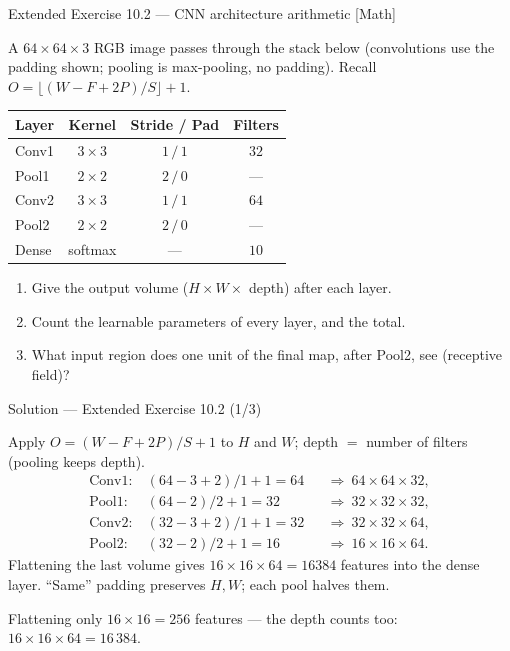 \documentclass[aspectratio=169,11pt]{beamer}
\begin{document}
\begin{frame}{Extended Exercise 10.2 --- CNN architecture arithmetic [Math]}
\begin{longexercise}
  A $64\times64\times3$ RGB image passes through the stack below (convolutions use the
  padding shown; pooling is max-pooling, no padding). Recall
  $O=\big\lfloor(W-F+2P)/S\big\rfloor+1$.
  \begin{center}\footnotesize
  \begin{tabular}{lccc}
    \toprule
    Layer & Kernel & Stride / Pad & Filters \\
    \midrule
    Conv1 & $3\times3$ & $1\,/\,1$ & $32$ \\
    Pool1 & $2\times2$ & $2\,/\,0$ & --- \\
    Conv2 & $3\times3$ & $1\,/\,1$ & $64$ \\
    Pool2 & $2\times2$ & $2\,/\,0$ & --- \\
    Dense & softmax & --- & $10$ \\
    \bottomrule
  \end{tabular}
  \end{center}
  \begin{enumerate}
    \item Give the output volume ($H\times W\times$ depth) after each layer.
    \item Count the learnable parameters of every layer, and the total.
    \item What input region does one unit of the final map, after Pool2, see
          (receptive field)?
  \end{enumerate}
\end{longexercise}
\end{frame}

\begin{frame}{Solution --- Extended Exercise 10.2 (1/3)}
\begin{solutionbox}
  Apply $O=(W-F+2P)/S+1$ to $H$ and $W$; depth $=$ number of filters (pooling keeps
  depth).
  \[
    \begin{aligned}
      \text{Conv1}:&\ (64-3+2)/1+1=64 &&\Rightarrow\ 64\times64\times32,\\
      \text{Pool1}:&\ (64-2)/2+1=32   &&\Rightarrow\ 32\times32\times32,\\
      \text{Conv2}:&\ (32-3+2)/1+1=32 &&\Rightarrow\ 32\times32\times64,\\
      \text{Pool2}:&\ (32-2)/2+1=16   &&\Rightarrow\ 16\times16\times64.
    \end{aligned}
  \]
  Flattening the last volume gives $16\times16\times64=16384$ features into the dense
  layer. ``Same'' padding preserves $H,W$; each pool halves them.

\end{solutionbox}
\begin{mistake}
  Flattening only $16\times16=256$ features --- the depth counts too:
  $16\times16\times64=16\,384$.
\end{mistake}
\end{frame}
\end{document}
